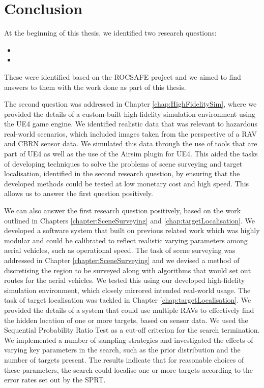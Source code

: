 
\chapter{Conclusion}
At the beginning of this thesis, we identified two research questions: 
\begin{itemize}
    \item  
    \item 
\end{itemize}
These were identified based on the ROCSAFE project and we aimed to find answers to them with the work done as part of this thesis.

\par The second question was addressed in Chapter \ref{chap:HighFidelitySim}, where we provided the details of a custom-built high-fidelity simulation environment using the UE4 game engine. We identified realistic data that was relevant to hazardous real-world scenarios, which included images taken from the perspective of a RAV and CBRN sensor data. We simulated this data through the use of tools that are part of UE4 as well as the use of the Airsim \cite{Shah2017AirSim:Vehicles} plugin for UE4. This aided the tasks of developing techniques to solve the problems of scene surveying and target localisation, identified in the second research question, by ensuring that the developed methods could be tested at low monetary cost and high speed. This allows us to answer the first question positively.

\par We can also answer the first research question positively, based on the work outlined in Chapters \ref{chapter:SceneSurveying} and \ref{chap:targetLocalisation}. We developed a software system that built on previous related work which was highly modular and could be calibrated to reflect realistic varying parameters among aerial vehicles, such as operational speed. The task of scene surveying was addressed in Chapter \ref{chapter:SceneSurveying} and we devised a method of discretising the region to be surveyed along with algorithms that would set out routes for the aerial vehicles. We tested this using our developed high-fidelity simulation environment, which closely mirrored intended real-world usage. The task of target localisation was tackled in Chapter \ref{chap:targetLocalisation}. We provided the details of a system that could use multiple RAVs to effectively find the hidden location of one or more targets, based on sensor data. We used the Sequential Probability Ratio Test as a cut-off criterion for the search termination. We implemented a number of sampling strategies and investigated the effects of varying key parameters in the search, such as the prior distribution and the number of targets present. The results indicate that for reasonable choices of these parameters, the search could localise one or more targets according to the error rates set out by the SPRT. 
